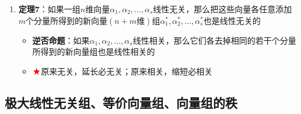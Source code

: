 \documentclass[./linear_algebra.tex]{subfiles}
\begin{document}
\begin{enumerate}
        \item \textbf{定理7}：如果一组$n$维向量$\alpha_1, \alpha_2, \dots, \alpha_s$线性无关，那么把这些向量各任意添加$m$个分量所得到的新向量$(n+m\text{维})$组$\alpha_1^*, \alpha_2^*, \dots, \alpha_s^*$也是线性无关的
        \begin{itemize}
            \item \textbf{逆否命题}：如果$\alpha_1, \alpha_2, \dots, \alpha_s$线性相关，那么它们各去掉相同的若干个分量所得到的新向量组也是线性相关的
            \item $\color{red}{\bigstar}$原来无关，延长必无关；原来相关，缩短必相关
        \end{itemize}
    \end{enumerate}

    \subsection{极大线性无关组、等价向量组、向量组的秩}
\end{document}
